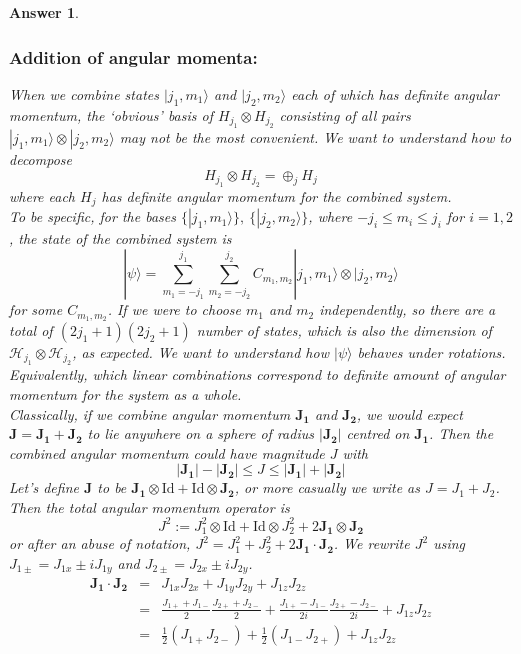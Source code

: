 \documentclass[a4paper]{article}
\newtheorem{ans}{Answer}[subsection]
\theoremstyle{new}
\begin{document}
\begin{ans}
\subsubsection*{Addition of angular momenta:}
When we combine states $|j_1,m_1\rangle$ and $|j_2,m_2\rangle$ each of which has definite angular momentum, the `obvious' basis of $H_{j_1}\otimes H_{j_2}$ consisting of all pairs $|j_1,m_1\rangle\otimes|j_2,m_2\rangle$ may not be the most convenient. We want to understand how to decompose $$H_{j_1}\otimes H_{j_2}=\oplus_jH_j$$ where each $H_j$ has definite angular momentum for the combined system.\\[5pt]
To be specific, for the bases  $\{|j_1,m_1\rangle\},~\{|j_2,m_2\rangle\}$, where $-j_i\leq m_i\leq j_i$ for $i=1,2$, the state of the combined system is
$$|\psi\rangle=\sum_{m_1=-j_1}^{j_1}\sum_{m_2=-j_2}^{j_2}C_{m_1,m_2}|j_1,m_1\rangle\otimes|j_2,m_2\rangle$$
for some $C_{m_1,m_2}$. If we were to choose $m_1$ and $m_2$ independently, so there are a total of $(2j_1+1)(2j_2+1)$ number of states, which is also the dimension of $\mathcal{H}_{j_1}\otimes\mathcal{H}_{j_2}$, as expected. We want to understand how $|\psi\rangle$ behaves under rotations. Equivalently, which linear combinations correspond to definite amount of angular momentum for the system as a whole.\\[5pt]
Classically, if we combine angular momentum $\mathbf{J_1}$ and $\mathbf{J_2}$, we would expect $\mathbf{J}=\mathbf{J_1}+\mathbf{J_2}$ to lie anywhere on a sphere of radius $|\mathbf{J_2}|$ centred on $\mathbf{J_1}$. Then the combined angular momentum could have magnitude $J$ with
$$|\mathbf{J_1}|-|\mathbf{J_2}|\leq J\leq|\mathbf{J_1}|+|\mathbf{J_2}|$$
Let's define $\mathbf{J}$ to be $\mathbf{J_1}\otimes\text{Id}+\text{Id}\otimes\mathbf{J_2}$, or more casually we write as $J=J_1+J_2$. Then the total angular momentum operator is
$$J^2:=J_1^2\otimes\text{Id}+\text{Id}\otimes J_2^2+2\mathbf{J_1}\otimes\mathbf{J_2}$$
or after an abuse of notation, $J^2=J_1^2+J_2^2+2\mathbf{J_1}\cdot\mathbf{J_2}$. We rewrite $J^2$ using $J_{1\pm}=J_{1x}\pm iJ_{1y}$ and $J_{2\pm}=J_{2x}\pm i J_{2y}$.
\begin{eqnarray}
\mathbf{J_1}\cdot\mathbf{J_2}&=&J_{1x}J_{2x}+J_{1y}J_{2y}+J_{1z}J_{2z}\nonumber\\&=&\frac{J_{1+}+J_{1-}}{2}\frac{J_{2+}+J_{2-}}{2}+\frac{J_{1+}-J_{1-}}{2i}\frac{J_{2+}-J_{2-}}{2i}+J_{1z} J_{2z}\nonumber\\&=&\frac{1}{2}(J_{1+} J_{2-})+\frac{1}{2}(J_{1-} J_{2+})+J_{1z}J_{2z}\nonumber
\end{eqnarray}

\end{ans}
\end{document}
